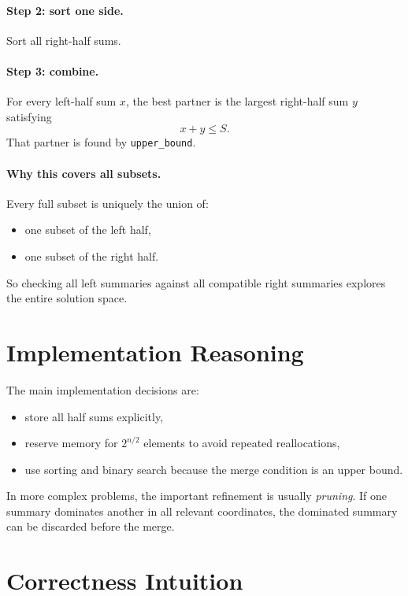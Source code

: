 \paragraph{Step 2: sort one side.}
Sort all right-half sums.

\paragraph{Step 3: combine.}
For every left-half sum \(x\), the best partner is the largest right-half sum \(y\) satisfying
\[
x + y \le S.
\]
That partner is found by \texttt{upper\_bound}.

\paragraph{Why this covers all subsets.}
Every full subset is uniquely the union of:

\begin{itemize}
  \item one subset of the left half,
  \item one subset of the right half.
\end{itemize}

So checking all left summaries against all compatible right summaries explores the entire solution space.

\section*{Implementation Reasoning}

The main implementation decisions are:

\begin{itemize}
  \item store all half sums explicitly,
  \item reserve memory for \(2^{n/2}\) elements to avoid repeated reallocations,
  \item use sorting and binary search because the merge condition is an upper bound.
\end{itemize}

In more complex problems, the important refinement is usually \emph{pruning}. If one summary dominates another in all
relevant coordinates, the dominated summary can be discarded before the merge.

\section*{Correctness Intuition}

